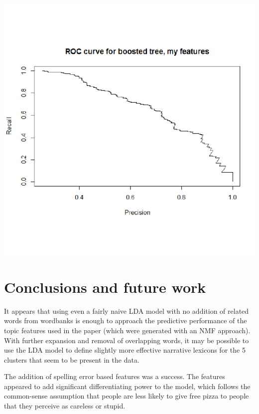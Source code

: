 \documentclass{article}\usepackage[]{graphicx}\usepackage[]{color}
\makeatletter
\def\maxwidth{ %
  \ifdim\Gin@nat@width>\linewidth
    \linewidth
  \else
    \Gin@nat@width
  \fi
}
\newenvironment{knitrout}{}{} %
\makeatother
\begin{document}
\begin{knitrout}
\color{fgcolor}

{\centering \includegraphics[width=\maxwidth]{figure/unnamed-chunk-15-1} 

}



\end{knitrout}

\section{Conclusions and future work}

It appears that using even a fairly naive LDA model with no addition of related words from wordbanks is enough to approach the predictive performance of the topic features used in the paper (which were generated with an NMF approach). With further expansion and removal of overlapping words, it may be possible to use the LDA model to define slightly more effective narrative lexicons for the 5 clusters that seem to be present in the data.

The addition of spelling error based features was a success. The features appeared to add significant differentiating power to the model, which follows the common-sense assumption that people are less likely to give free pizza to people that they perceive as careless or stupid.
\end{document}
